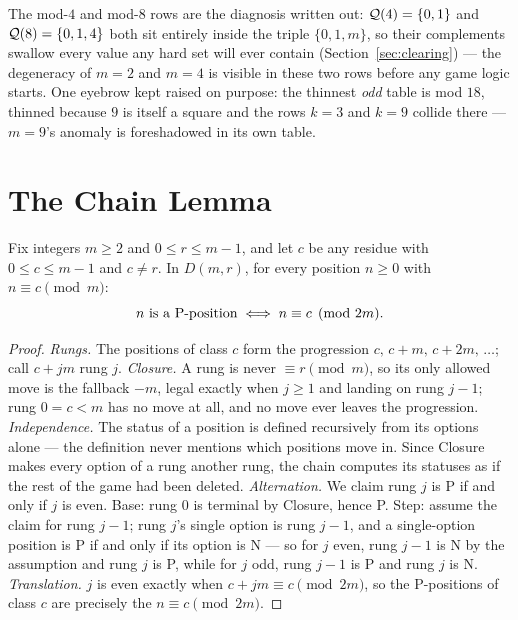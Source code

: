 The mod-$4$ and mod-$8$ rows are the diagnosis written out: $\mathcal{Q}(4) =
\{0, 1\}$ and $\mathcal{Q}(8) = \{0, 1, 4\}$ both sit entirely inside the triple
$\{0, 1, m\}$, so their complements swallow every value any hard set will
ever contain (Section~\ref{sec:clearing}) --- the degeneracy of $m = 2$ and
$m = 4$ is visible in these two rows before any game logic starts. One
eyebrow kept raised on purpose: the thinnest \emph{odd} table is mod
$18$, thinned because $9$ is itself a square and the rows $k = 3$ and
$k = 9$ collide there --- $m = 9$'s anomaly is foreshadowed in its own
table.

\section{The Chain Lemma}\label{sec:chain}

\begin{lemma}\label{lem:chain}
Fix integers $m \ge 2$ and $0 \le r \le m-1$, and let $c$ be any residue
with $0 \le c \le m-1$ and $c \ne r$. In $D(m,r)$, for every position
$n \ge 0$ with $n \equiv c \pmod m$:
\[ n \text{ is a \ensuremath{\mathrm{P}}-position} \iff n \equiv c \pmod{2m}. \]
\end{lemma}
\begin{proof}
\emph{Rungs.} The positions of class $c$ form the progression
$c,\, c+m,\, c+2m,\, \dots$; call $c + jm$ rung $j$.
\emph{Closure.} A rung is never $\equiv r \pmod{m}$, so its only allowed
move is the fallback $-m$, legal exactly when $j \ge 1$ and landing on
rung $j-1$; rung $0 = c < m$ has no move at all, and no move ever leaves
the progression.
\emph{Independence.} The status of a position is defined recursively from
its options alone --- the definition never mentions which positions move
in. Since Closure makes every option of a rung another rung, the chain
computes its statuses as if the rest of the game had been deleted.
\emph{Alternation.} We claim rung $j$ is P if and only if $j$ is even.
Base: rung $0$ is terminal by Closure, hence P. Step: assume the claim
for rung $j-1$; rung $j$'s single option is rung $j-1$, and a
single-option position is P if and only if its option is N --- so for $j$
even, rung $j-1$ is N by the assumption and rung $j$ is P, while for $j$
odd, rung $j-1$ is P and rung $j$ is N.
\emph{Translation.} $j$ is even exactly when $c + jm \equiv c \pmod{2m}$,
so the P-positions of class $c$ are precisely the $n \equiv c \pmod{2m}$.
\end{proof}

